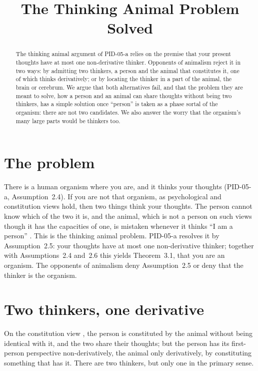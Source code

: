 \documentclass{situationist-preprint}
\title{The Thinking Animal Problem Solved}
\begin{document}
\maketitle

\begin{abstract}
The thinking animal argument of PID-05-a relies on the premise that your present thoughts have at most one non-derivative thinker. Opponents of animalism reject it in two ways: by admitting two thinkers, a person and the animal that constitutes it, one of which thinks derivatively; or by locating the thinker in a part of the animal, the brain or cerebrum. We argue that both alternatives fail, and that the problem they are meant to solve, how a person and an animal can share thoughts without being two thinkers, has a simple solution once \enquote{person} is taken as a phase sortal of the organism: there are not two candidates. We also answer the worry that the organism's many large parts would be thinkers too.
\end{abstract}

\section{The problem}

There is a human organism where you are, and it thinks your thoughts (PID-05-a, Assumption~2.4). If you are not that organism, as psychological and constitution views hold, then two things think your thoughts. The person cannot know which of the two it is, and the animal, which is not a person on such views though it has the capacities of one, is mistaken whenever it thinks \enquote{I am a person} \citep{Olson1997,Snowdon1990}. This is the thinking animal problem. PID-05-a resolves it by Assumption~2.5: your thoughts have at most one non-derivative thinker; together with Assumptions~2.4 and~2.6 this yields Theorem~3.1, that you are an organism. The opponents of animalism deny Assumption~2.5 or deny that the thinker is the organism.

\section{Two thinkers, one derivative}

On the constitution view \citep{Baker2000}, the person is constituted by the animal without being identical with it, and the two share their thoughts; but the person has its first-person perspective non-derivatively, the animal only derivatively, by constituting something that has it. There are two thinkers, but only one in the primary sense.
\end{document}

